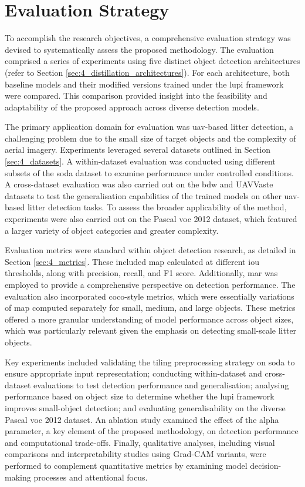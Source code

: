 \section{Evaluation Strategy}
\label{sec:5_evaluation_strategy}

To accomplish the research objectives, a comprehensive evaluation strategy was devised to systematically assess the proposed methodology. The evaluation comprised a series of experiments using five distinct object detection architectures (refer to Section \ref{sec:4_distillation_architectures}). For each architecture, both baseline models and their modified versions trained under the \gls{lupi} framework were compared. This comparison provided insight into the feasibility and adaptability of the proposed approach across diverse detection models.

The primary application domain for evaluation was \gls{uav}-based litter detection, a challenging problem due to the small size of target objects and the complexity of aerial imagery. Experiments leveraged several datasets outlined in Section \ref{sec:4_datasets}.  A within-dataset evaluation was conducted using different subsets of the \gls{soda} dataset to examine performance under controlled conditions. A cross-dataset evaluation was also carried out on the \gls{bdw} and UAVVaste datasets to test the generalisation capabilities of the trained models on other \gls{uav}-based litter detection tasks. To assess the broader applicability of the method, experiments were also carried out on the Pascal \gls{voc} 2012 dataset, which featured a larger variety of object categories and greater complexity.

Evaluation metrics were standard within object detection research, as detailed in Section \ref{sec:4_metrics}. These included \gls{map} calculated at different \gls{iou} thresholds, along with precision, recall, and F1 score. Additionally, \gls{mar} was employed to provide a comprehensive perspective on detection performance. The evaluation also incorporated \gls{coco}-style metrics, which were essentially variations of \gls{map} computed separately for small, medium, and large objects. These metrics offered a more granular understanding of model performance across object sizes, which was particularly relevant given the emphasis on detecting small-scale litter objects.

Key experiments included validating the tiling preprocessing strategy on \gls{soda} to ensure appropriate input representation; conducting within-dataset and cross-dataset evaluations to test detection performance and generalisation; analysing performance based on object size to determine whether the \gls{lupi} framework improves small-object detection; and evaluating generalisability on the diverse Pascal \gls{voc} 2012 dataset. An ablation study examined the effect of the \gls{alpha} parameter, a key element of the proposed methodology, on detection performance and computational trade-offs. Finally, qualitative analyses, including visual comparisons and interpretability studies using Grad-CAM variants, were performed to complement quantitative metrics by examining model decision-making processes and attentional focus.

